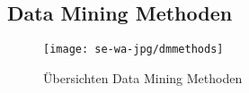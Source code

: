 \subsection{Data Mining Methoden}
\label{dmmethoden}

\begin{figure}[H]
\centering
\texttt{[image: se-wa-jpg/dmmethods]}
\caption[Übersichten Data Mining Methoden]{Übersichten Data Mining Methoden\protect\footnotemark}
\label{dmmethods}
\end{figure}

